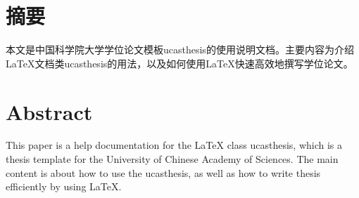 \maketitle%
\makedeclaration%
\chapter{ 摘\quad 要}%
\setcounter{page}{1}%

本文是中国科学院大学学位论文模板ucasthesis的使用说明文档。主要内容为介绍\LaTeX{}文档类ucasthesis的用法，以及如何使用\LaTeX{}快速高效地撰写学位论文。

\chapter{\bfseries {} \fontsize{15pt}{15pt} Abstract}%

\fontsize{12}{15}
This paper is a help documentation for the \LaTeX{} class ucasthesis, which is  a thesis template for the University of Chinese Academy of Sciences. The main content is about how to use the ucasthesis, as well as how to write thesis efficiently by using \LaTeX{}.

